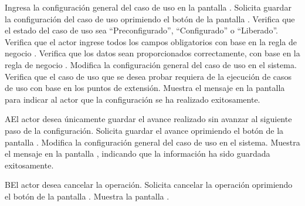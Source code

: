  \begin{UCtrayectoria}
    \UCpaso[\UCactor] Ingresa la configuración general del caso de uso en la pantalla .\label{cu5.7.1:ingresaDatos}
    \UCpaso[\UCactor] Solicita guardar la configuración del caso de uso oprimiendo el botón  de la pantalla .  
    \UCpaso[\UCsist] Verifica que el estado del caso de uso sea ``Preconfigurado'', ``Configurado'' o ``Liberado''. 	
    \UCpaso[\UCsist] Verifica que el actor ingrese todos los campos obligatorios con base en la regla de negocio  . 
	    \UCpaso[\UCsist] Verifica que los datos sean proporcionados correctamente, con base en la regla de negocio .      
    \UCpaso[\UCsist] Modifica la configuración general del caso de uso en el sistema.	
    \UCpaso[\UCsist] Verifica que el caso de uso que se desea probar requiera de la ejecución de casos de uso con base en los puntos de extensión. 
    \UCpaso[\UCsist] Muestra el mensaje  en la pantalla  para indicar al actor que la configuración se ha realizado exitosamente.
 \end{UCtrayectoria}
 
 \begin{UCtrayectoriaA}{A}{El actor desea únicamente guardar el avance realizado sin avanzar al siguiente paso de la configuración.}
     \UCpaso[\UCactor] Solicita guardar el avance oprimiendo el botón  de la pantalla .
    \UCpaso[\UCsist] Modifica la configuración general del caso de uso en el sistema.	
    \UCpaso[\UCsist] Muestra el mensaje  en la pantalla , indicando que la información ha sido guardada exitosamente.
 \end{UCtrayectoriaA}
 

 \begin{UCtrayectoriaA}{B}{El actor desea cancelar la operación.}
    \UCpaso[\UCactor] Solicita cancelar la operación oprimiendo el botón  de la pantalla .
    \UCpaso[\UCsist] Muestra la pantalla .
 \end{UCtrayectoriaA}
 
